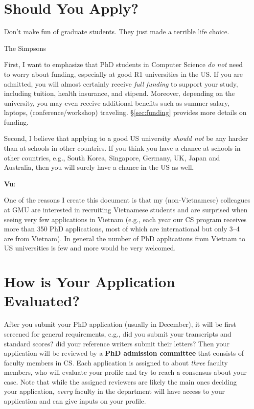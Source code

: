 \documentclass[11pt]{article}
\newenvironment{commentbox}[1][]{
\small
    \begin{cbox}
    \textbf{#1}: 
 }{
   \end{cbox}
}
\begin{document}
\section{Should You Apply?}
\epigraph{Don't make fun of graduate students. They just made a terrible life choice.}{The Simpsons}

First, I want to emphasize that PhD students in Computer
Science \emph{do not} need to worry about funding, especially at good R1
universities in the US. If you are admitted, you will almost certainly
receive \emph{full funding} to support your study, including tuition,
health insurance, and stipend. Moreover, depending on the university,
you may even receive additional benefits such as summer salary, laptops, (conference/workshop) traveling. \S\ref{sec:funding} provides more details on funding.

Second, I believe that applying to a good US university \emph{should not} be any
harder than at schools in other countries. If you think you have a
chance at schools in other countries, e.g., South Korea, Singapore, Germany, UK, Japan and Australia, then you will surely have a chance in the US as well.

\begin{commentbox}[Vu]
One of the reasons I create this document is that my (non-Vietnamese) colleagues at GMU are interested in 
recruiting Vietnamese students and are surprised when seeing very few applications in Vietnam (e.g., each year our CS program receives more than 350 PhD applications, most of which are international but only 3--4 are from Vietnam). In general the number of
PhD applications from Vietnam to US universities is few and  more would be very welcomed. 
\end{commentbox}



\section{How is Your Application Evaluated?}

After you submit your PhD application (usually in December), it will be first screened
for general requirements, e.g., did you submit your transcripts and standard scores? did your reference writers submit their letters?
Then your application will be reviewed by a
\textbf{PhD admission committee} that consists of faculty members in CS. Each application is assigned to about \emph{three} faculty members, who will evaluate your profile and try to reach a consensus about your case.  Note that while the assigned reviewers are likely the main ones deciding your application, \emph{every} faculty in the department will have access to your application and can give inputs on your profile.
\end{document}
